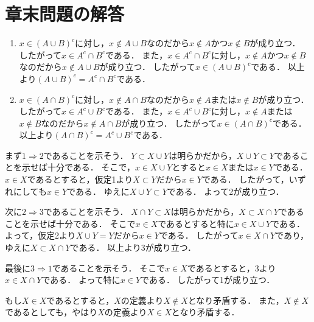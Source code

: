 \documentclass[./main]{subfiles} %
\theoremstyle{definition}
\begin{document}
\section{章末問題の解答}
\begin{enumerate}
\item $x\in(A\cup B)^c$に対し，$x\notin A\cup B$なのだから$x\notin A$かつ$x\notin B$が成り立つ．
したがって$x\in A^c\cap B^c$である．
また，$x\in A^c\cap B^c$に対し，$x\notin A$かつ$x\notin B$なのだから$x\notin A\cup B$が成り立つ．
したがって$x\in(A\cup B)^c$である．
以上より$(A\cup B)^c=A^c\cap B^c$である．
\item $x\in(A\cap B)^c$に対し，$x\notin A\cap B$なのだから$x\notin A$または$x\notin B$が成り立つ．
したがって$x\in A^c\cup B^c$である．
また，$x\in A^c\cup B^c$に対し，$x\notin A$または$x\notin B$なのだから$x\notin A\cap B$が成り立つ．
したがって$x\in(A\cap B)^c$である．
以上より$(A\cap B)^c=A^c\cup B^c$である．
\end{enumerate}

まず$1\Rightarrow2$であることを示そう．
$Y\subset X\cup Y$は明らかだから，$X\cup Y\subset Y$であることを示せば十分である．
そこで，$x\in X\cup Y$とすると$x\in X$または$x\in Y$である．
$x\in X$であるとすると，仮定1より$X\subset Y$だから$x\in Y$である．
したがって，いずれにしても$x\in Y$である．
ゆえに$X\cup Y\subset Y$である．
よって2が成り立つ．

次に$2\Rightarrow3$であることを示そう．
$X\cap Y\subset X$は明らかだから，$X\subset X\cap Y$であることを示せば十分である．
そこで$x\in X$であるとすると特に$x\in X\cup Y$である．
よって，仮定2より$X\cup Y=Y$だから$x\in Y$である．
したがって$x\in X\cap Y$であり，ゆえに$X\subset X\cap Y$である．
以上より3が成り立つ．

最後に$3\Rightarrow1$であることを示そう．
そこで$x\in X$であるとすると，3より$x\in X\cap Y$である．
よって特に$x\in Y$である．
したがって1が成り立つ．

もし$X\in X$であるとすると，$X$の定義より$X\notin X$となり矛盾する．
また，$X\notin X$であるとしても，やはり$X$の定義より$X\in X$となり矛盾する．
\end{document}

